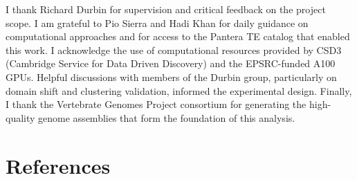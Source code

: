 \documentclass[12pt]{article}
\begin{document}
I thank Richard Durbin for supervision and critical feedback on the project scope. I am grateful to Pio Sierra and Hadi Khan for daily guidance on computational approaches and for access to the Pantera TE catalog that enabled this work. I acknowledge the use of computational resources provided by CSD3 (Cambridge Service for Data Driven Discovery) and the EPSRC-funded A100 GPUs. Helpful discussions with members of the Durbin group, particularly on domain shift and clustering validation, informed the experimental design. Finally, I thank the Vertebrate Genomes Project consortium for generating the high-quality genome assemblies that form the foundation of this analysis.

\newpage
\section*{References}
\end{document}
